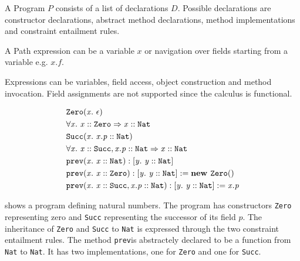 A Program $P$ consists of a list of declarations $D$.
Possible declarations are constructor declarations,
abstract method declarations, method implementations and constraint entailment rules.

A Path expression can be a variable $x$ or navigation over fields starting from a variable e.g. $x.f$.

Expressions can be variables, field access, object construction and method invocation.
Field assignments are not supported since the calculus is functional.
%
\begin{example}
\label{ex:dcc-naturalnumbers}
\begin{align*}
&\mathit{\texttt{Zero}}(\mathit{x}.\ \mathit{\epsilon})\\
& \forall \mathit{x}.\ \mathit{\mathit{x} :: \mathit{\texttt{Zero}}} \Rightarrow \mathit{\mathit{x} :: \mathit{\texttt{Nat}}}\\
&\mathit{\texttt{Succ}}(\mathit{x}.\ \mathit{\mathit{x.p} :: \mathit{\texttt{Nat}}})\\
& \forall \mathit{x}.\ \mathit{\mathit{x} :: \mathit{\texttt{Succ}}, \mathit{x.p} :: \mathit{\texttt{Nat}}} \Rightarrow \mathit{\mathit{x} :: \mathit{\texttt{Nat}}}\\
&\mathit{\texttt{prev}}(\mathit{x}.\ \mathit{\mathit{x} :: \mathit{\texttt{Nat}}}): \mathit{[y.\ \mathit{\mathit{y} :: \mathit{\texttt{Nat}}}]}\\
&\mathit{\texttt{prev}}(\mathit{x}.\ \mathit{\mathit{x} :: \mathit{\texttt{Zero}}}): \mathit{[y.\ \mathit{\mathit{y} :: \mathit{\texttt{Nat}}}]} := \mathit{\textbf{new } \mathit{\texttt{Zero}}()}\\
&\mathit{\texttt{prev}}(\mathit{x}.\ \mathit{\mathit{x} :: \mathit{\texttt{Succ}}, \mathit{x.p} :: \mathit{\texttt{Nat}}}): \mathit{[y.\ \mathit{\mathit{y} :: \mathit{\texttt{Nat}}}]} := \mathit{x.p}
\end{align*}
\end{example}
%
 shows a program defining natural numbers.
The program has constructors \texttt{Zero} representing zero
and \texttt{Succ} representing the successor of its field $p$.
The inheritance of \texttt{Zero} and \texttt{Succ} to \texttt{Nat}
is expressed through the two constraint entailment rules.
The method \texttt{prev}is abstractely declared to
be a function from \texttt{Nat} to \texttt{Nat}.
It has two implementations,
one for \texttt{Zero} and one for \texttt{Succ}.

